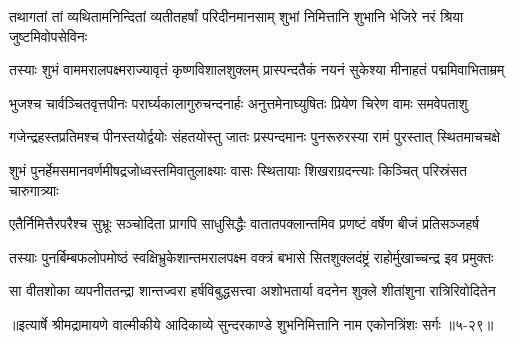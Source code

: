 
\twolineshloka
{तथागतां तां व्यथितामनिन्दितां व्यतीतहर्षां परिदीनमानसाम्}
{शुभां निमित्तानि शुभानि भेजिरे नरं श्रिया जुष्टमिवोपसेविनः} %

\twolineshloka
{तस्याः शुभं वाममरालपक्ष्मराज्यावृतं कृष्णविशालशुक्लम्}
{प्रास्पन्दतैकं नयनं सुकेश्या मीनाहतं पद्ममिवाभिताम्रम्} %

\twolineshloka
{भुजश्च चार्वञ्चितवृत्तपीनः परार्घ्यकालागुरुचन्दनार्हः}
{अनुत्तमेनाघ्युषितः प्रियेण चिरेण वामः समवेपताशु} %

\twolineshloka
{गजेन्द्रहस्तप्रतिमश्च पीनस्तयोर्द्वयोः संहतयोस्तु जातः}
{प्रस्पन्दमानः पुनरूरुरस्या रामं पुरस्तात् स्थितमाचचक्षे} %

\twolineshloka
{शुभं पुनर्हेमसमानवर्णमीषद्रजोध्वस्तमिवातुलाक्ष्याः}
{वासः स्थितायाः शिखराग्रदन्त्याः किञ्चित् परिस्रंसत चारुगात्र्याः} %

\twolineshloka
{एतैर्निमित्तैरपरैश्च सुभ्रूः सञ्चोदिता प्रागपि साधुसिद्धैः}
{वातातपक्लान्तमिव प्रणष्टं वर्षेण बीजं प्रतिसञ्जहर्ष} %

\twolineshloka
{तस्याः पुनर्बिम्बफलोपमोष्ठं स्वक्षिभ्रुकेशान्तमरालपक्ष्म}
{वक्त्रं बभासे सितशुक्लदंष्ट्रं राहोर्मुखाच्चन्द्र इव प्रमुक्तः} %

\twolineshloka
{सा वीतशोका व्यपनीततन्द्रा शान्तज्वरा हर्षविबुद्धसत्त्वा}
{अशोभतार्या वदनेन शुक्ले शीतांशुना रात्रिरिवोदितेन} %


॥इत्यार्षे श्रीमद्रामायणे वाल्मीकीये आदिकाव्ये सुन्दरकाण्डे शुभनिमित्तानि नाम एकोनत्रिंशः सर्गः ॥५-२९॥
